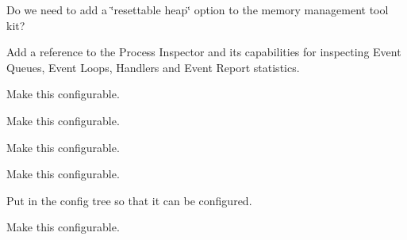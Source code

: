 \begin{DoxyRefList}
\item[\label{todo__todo000026}%
\hypertarget{todo__todo000026}{}%
Page \hyperlink{c_memory}{Dynamic Memory Allocation A\+PI} ]Do we need to add a \char`\"{}resettable heap\char`\"{} option to the memory management tool kit? 
\item[\label{todo__todo000022}%
\hypertarget{todo__todo000022}{}%
Page \hyperlink{c_eventLoop}{Event Loop A\+PI} ]Add a reference to the Process Inspector and its capabilities for inspecting Event Queues, Event Loops, Handlers and Event Report statistics. 
\item[\label{todo__todo000035}%
\hypertarget{todo__todo000035}{}%
Global \hyperlink{event_loop_8c_a3b6df48de0849c25c65fbbe990e2373c}{event\+\_\+\+Init} (void)]Make this configurable. 

Make this configurable. 

Make this configurable. 

Make this configurable.  
\item[\label{todo__todo000012}%
\hypertarget{todo__todo000012}{}%
Global \hyperlink{proc_8c_a2029b9157d992cc83c22bd6351c8057e}{F\+A\+U\+L\+T\+\_\+\+L\+I\+M\+I\+T\+\_\+\+I\+N\+T\+E\+R\+V\+A\+L\+\_\+\+R\+E\+S\+T\+A\+RT} ]Put in the config tree so that it can be configured.  
\item[\label{todo__todo000040}%
\hypertarget{todo__todo000040}{}%
Global \hyperlink{fd_monitor_8h_a19c8a1005007350074559f38fa0b7fe7}{fd\+Mon\+\_\+\+Init} (void)]Make this configurable. 


\end{DoxyRefList}
